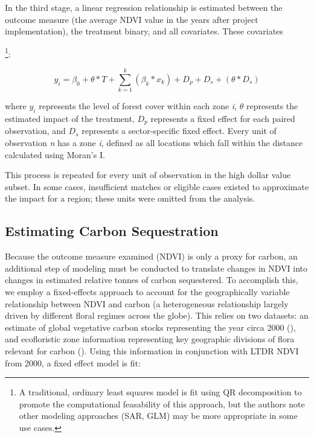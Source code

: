 \documentclass{article}\usepackage[]{graphicx}\usepackage[]{color}
\newenvironment{knitrout}{}{}  %
\begin{document}
\begin{knitrout}
In the third stage, a linear regression relationship is estimated between the outcome measure (the average NDVI value in the years after project implementation), the treatment binary, and all covariates.
These covariates 

\footnote{A traditional, ordinary least squares model is fit using QR decomposition to promote the computational feasability of this approach, but the authors note other modeling approaches (SAR, GLM) may be more appropriate in some use cases.}:

\begin{equation}
y_i = \beta_{0} + \theta * T + \sum_{k=1}^{k}(\beta_{k}*x_{k}) + D_{p} + D_{s} + (\theta * D_{s})
\label{EQgwr}
\end{equation}

where \begin{math}y_{i}\end{math} represents the level of forest cover within each zone \textit{i}, \begin{math}\theta\end{math} represents the estimated impact of the treatment, \begin{math}D_{p}\end{math} represents a fixed effect for each paired observation, and \begin{math}D_{s}\end{math} represents a sector-specific fixed effect.
Every unit of observation \textit{n} has a zone \textit{i}, defined as all locations which fall within the distance calculated using Moran's I.

\par

This process is repeated for every unit of observation in the high dollar value subset.  
In some cases, insufficient matches or eligible cases existed to approximate the impact for a region; these units were omitted from the analysis.

\subsection{Estimating Carbon Sequestration}
Because the outcome measure examined (NDVI) is only a proxy for carbon, an additional step of modeling must be conducted to translate changes in NDVI into changes in estimated relative tonnes of carbon sequestered.
To accomplish this, we employ a fixed-effects approach to account for the geographically variable relationship between NDVI and carbon (a heterogeneous relationship largely driven by different floral regimes across the globe).
This relies on two datasets: an estimate of global vegetative carbon stocks representing the year circa 2000 (\cite{saatchi_benchmark_2011}), and ecofloristic zone information representing key geographic divisions of flora relevant for carbon (\cite{ruesch_new_2008}).
Using this information in conjunction with LTDR NDVI from 2000, a fixed effect model is fit:


\end{knitrout}
\end{document}
